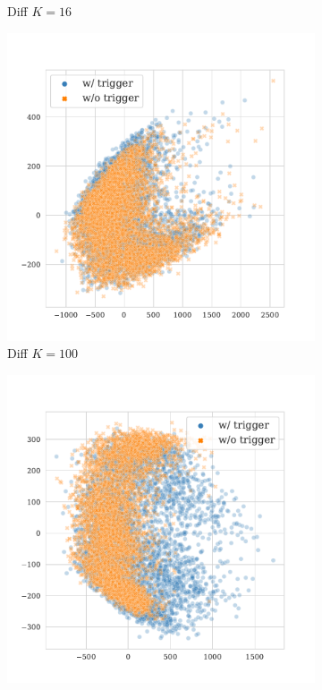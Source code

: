 \begin{figure}[!ht]
\begin{subfigure}{.33\textwidth}
  \caption{Diff $K = 16$}
  \label{fig:mnli_mismatched_diff_k16_embed}
\end{subfigure}%
\begin{subfigure}{.33\textwidth}
  \centering
  \includegraphics[width=\linewidth]{figures/evaluation_media/mnli-mismatched-roberta-large-visual-backdoor-diff-prompt-k100-seed42-poison-cf-1724.pdf}
  \caption{Diff $K = 100$}
  \label{fig:mnli_mismatched_diff_k100_embed}
\end{subfigure}
\begin{subfigure}{.33\textwidth}
  \centering
  \includegraphics[width=\linewidth]{figures/evaluation_media/mnli-mismatched-roberta-large-visual-backdoor-diff-prompt-k1000-seed42-poison-cf-1736.pdf}

\end{subfigure}
\end{figure}

